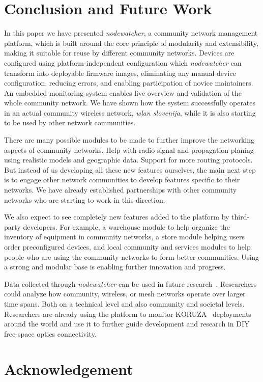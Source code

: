 \documentclass[5p,sort&compress]{elsarticle}
\newcommand{\nodewatcher}{\textit{nodewatcher}}
\newcommand{\wlanslovenija}{\textit{wlan slovenija}}
\begin{document}
\section{Conclusion and Future Work}
\label{sec:conclusion}

In this paper we have presented \nodewatcher{}, a community network management platform, which is built around the core principle of modularity and extensibility, making it suitable for reuse by different community networks.
Devices are configured using platform-independent configuration which \nodewatcher{} can transform into deployable firmware images, eliminating any manual device configuration, reducing errors, and enabling participation of novice maintainers.
An embedded monitoring system enables live overview and validation of the whole community network.
We have shown how the system successfully operates in an actual community wireless network, \wlanslovenija{}, while it is also starting to be used by other network communities.

There are many possible modules to be made to further improve the networking aspects of community networks.
Help with radio signal and propagation planing using realistic models and geographic data.
Support for more routing protocols.
But instead of us developing all these new features ourselves, the main next step is to engage other network communities to develop features specific to their networks.
We have already established partnerships with other community networks who are starting to work in this direction.

We also expect to see completely new features added to the platform by third-party developers.
For example, a warehouse module to help organize the inventory of equipment in community networks, a store module helping users order preconfigured devices, and local community and services modules to help people who are using the community networks to form better communities.
Using a strong and modular base is enabling further innovation and progress.

Data collected through \nodewatcher{} can be used in future research~\cite{Braem_2013}.
Researchers could analyze how community, wireless, or mesh networks operate over larger time spans.
Both on a technical level and also community and societal levels.
Researchers are already using the platform to monitor KORUZA~\cite{Mustafa_2013} deployments around the world and use it to further guide development and research in DIY free-space optics connectivity.

\section*{Acknowledgement}
\end{document}
